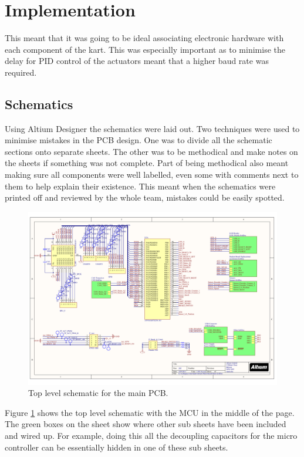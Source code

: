 \section{Implementation}
  This meant that it was going to be ideal associating electronic hardware with
  each component of the kart. This was especially important as to minimise the
  delay for PID control of the actuators meant that a higher baud rate was
  required. 

  \subsection{Schematics}
  Using Altium Designer the schematics were laid out. Two techniques were used
  to minimise mistakes in the PCB design. One was to divide all the schematic
  sections onto separate sheets. The other was to be methodical and make notes
  on the sheets if something was not complete. Part of being methodical also
  meant making sure all components were well labelled, even some with comments
  next to them to help explain their existence. This meant when the schematics
  were printed off and reviewed by the whole team, mistakes could be easily
  spotted.
  
  \begin{figure}[h]
      \centering
      \includegraphics[width=.8\linewidth]{../../Presentation/Henry/Images/Schematic.pdf}
      \caption{Top level schematic for the main PCB.}
      \label{main-schematic}
  \end{figure}

  Figure \ref{main-schematic} shows the top level schematic with the MCU in the
  middle of the page. The green boxes on the sheet show where other sub sheets
  have been included and wired up. For example, doing this all the decoupling
  capacitors for the micro controller can be essentially hidden in one of these
  sub sheets. 

